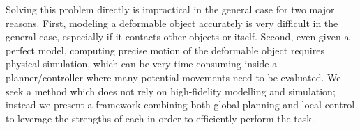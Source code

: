 Solving this problem directly is impractical in the general case for two major reasons. First, modeling a deformable object accurately is very difficult in the general case, especially if it contacts other objects or itself. Second, even given a perfect model, computing precise motion of the deformable object requires physical simulation, which can be very time consuming inside a planner/controller where many potential movements need to be evaluated. We seek a method which does not rely on high-fidelity modelling and simulation; instead we present a framework combining both global planning and local control to leverage the strengths of each in order to efficiently perform the task.









